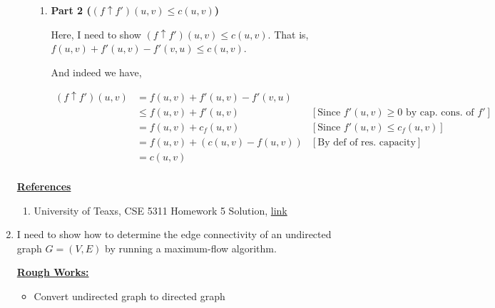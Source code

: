 \documentclass[12pt]{article}
\begin{document}
\begin{enumerate}[1.]
\begin{itemize}
\begin{enumerate}[1.]
            \item \textbf{Part 2 ($(f \uparrow f')(u,v) \leq c(u,v)$)}

            Here, I need to show $(f \uparrow f')(u,v) \leq c(u,v)$. That is,
            $f(u,v) + f'(u,v) - f'(v,u) \leq c(u,v)$.

            \bigskip

            And indeed we have,

            \begin{align}
            (f \uparrow f')(u,v) &= f(u,v)+ f'(u,v) - f'(v,u)\\
            &\leq f(u,v)+ f'(u,v) & [\text{Since $f'(u,v) \geq 0$ by cap. cons. of $f'$}]\\
            &= f(u,v)+ c_f(u,v) & [\text{Since $f'(u,v) \leq c_f(u,v)$}]\\
            &= f(u,v) + (c(u,v) - f(u,v)) & [\text{By def of res. capacity}]\\
            &= c(u,v)\\
            \end{align}

        \end{enumerate}

    \end{itemize}

    \bigskip

    \underline{\textbf{References}}

    \bigskip

    \begin{enumerate}[1)]
        \item University of Teaxs, CSE 5311 Homework 5 Solution, \href{http://ranger.uta.edu/~huang/teaching/CSE5311/HW5_Solution.pdf}{link}
    \end{enumerate}

    \item

    \bigskip

    I need to show how to determine the edge connectivity of an undirected graph
    $G = (V,E)$ by running a maximum-flow algorithm.

    \bigskip

    \underline{\textbf{Rough Works:}}

    \begin{itemize}

        \item Convert undirected graph to directed graph
        \begin{mdframed}


\end{mdframed}
\end{itemize}
\end{enumerate}
\end{document}
